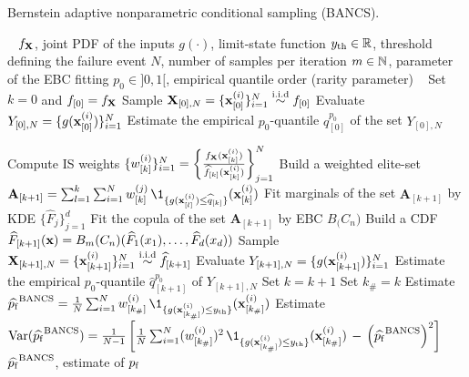 \begin{algorithm}[h]
    \caption{Bernstein adaptive nonparametric conditional sampling (BANCS).}\label{alg:bancs}
    \footnotesize
    \begin{algorithmic}[1]
        \State {}\hfill~
        \State $f_{\bf X}$, joint PDF of the inputs
        \State $g(\cdot)$, limit-state function
        \State $y_\mathrm{th} \in \mathbb{R}$, threshold defining the failure event 
        \State $N$, number of samples per iteration
        \State $m \in \mathbb{N}$, parameter of the EBC fitting
        \State $p_0 \in ]0, 1[$, empirical quantile order (rarity parameter)
        \State {}\hfill~
        \State Set $k = 0$ and $f_{[0]} = f_{\bf X}$
        \State Sample ${\bf X}_{[0], N} = \{{\bf x}_{[0]}^{(i)}\}_{i=1}^N \overset{\text{i.i.d}}{\sim} f_{[0]}$
        \State Evaluate $Y_{[0], N} = \{g({\bf x}_{[0]}^{(i)})\}_{i=1}^N$
        \State Estimate the empirical $p_0$-quantile $\widehat{q}_{[0]}^{p_0}$ of the set $Y_{[0], N}$
        
        \State Compute IS weights $\{w_{[k]}^{(i)}\}_{i=1}^N = \left\{\frac{f_{\bf X}({\bf x}_{[k]}^{(i)})}{\widehat{f}_{[k]}({\bf x}_{[k]}^{(i)})}\right\}_{j=1}^N$
        \State Build a weighted elite-set $\mathbf{A}_{[k+1]}=\sum_{l=1}^{k} \sum_{i=1}^N w_{[k]}^{(j)} \, \1_{\{g(\bx_{[l]}^{(i)}) \leq \widehat{q}_{[k]} \}}(\bx_{[k]}^{(i)})$
        \State Fit marginals of the set $\mathbf{A}_{[k+1]}$ by KDE $\{\widehat{F}_j\}_{j=1}^d$
        \State Fit the copula of the set $\mathbf{A}_{[k+1]}$ by EBC $B_\bm(C_n)$
        \State Build a CDF $\widehat{F}_{[k+1]}({\bf x}) = B_m(C_n)(\widehat{F}_1(x_1), \dots, \widehat{F}_d(x_d))$
        \State Sample ${\bf X}_{[k+1], N} = \{{\bf x}_{[k+1]}^{(i)}\}_{i=1}^N \overset{\text{i.i.d}}{\sim} \widehat{f}_{[k+1]}$
        \State Evaluate $Y_{[k+1], N} = \{g({\bf x}_{[k+1]}^{(i)})\}_{i=1}^N$
        \State Estimate the empirical $p_0$-quantile $\widehat{q}_{[k+1]}^{p_0}$ of $Y_{[k+1], N}$
\State Set $k = k+1$
\EndWhile
\State Set $k_\# = k$
\State Estimate $\widehat{\pf}^{\mathrm{BANCS}} = \frac1N \sum_{i=1}^N w_{[k_\#]}^{(i)} \, \1_{\{g(\bx_{[k_\#]}^{(i)}) \leq \yth \}}(\bx_{[k_\#]}^{(i)})$
\State Estimate $\var(\widehat{\pf}^{\mathrm{BANCS}}) = \frac{1}{N-1} \left[\frac1N \sum_{i=1}^N (w_{[k_\#]}^{(i)})^2 \, \1_{\{g(\bx_{[k_\#]}^{(i)}) \leq \yth \}}(\bx_{[k_\#]}^{(i)}) \, - \, \left(\widehat{\pf}^{\mathrm{BANCS}}\right)^2\right]$
\State {}\hfill~
\State $\widehat{p_\mathrm{f}}^{\mathrm{BANCS}}$, estimate of $p_\mathrm{f}$
\end{algorithmic}
\end{algorithm}
